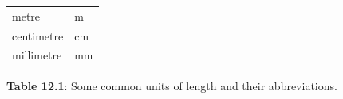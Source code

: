 {{\begin{center}
\begin{tabular}[t]{|l|l|}
    
        metre &
    
    
        m%
     \tabularnewline\cline{1-1}\cline{2-2}
    
    
        centimetre &
    
    
        cm%
     \tabularnewline\cline{1-1}\cline{2-2}
    
    
        millimetre &
    
    
        mm%
     \tabularnewline\cline{1-1}\cline{2-2}
    \end{tabular}
      \end{center}
    \begin{center}{\small\bfseries Table 12.1}: Some common units of length and their abbreviations.\end{center}
    
    \addtocounter{footnote}{-0}
    
          }{ %
        
}}
